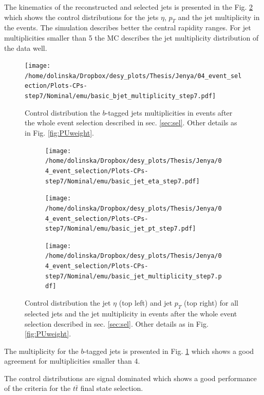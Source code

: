 The kinematics of the reconstructed and selected jets is presented in the Fig. \ref{fig:CPjetskin} which shows the control distributions for the
jets $\eta$, $p_{T}$ and the jet multiplicity in the events. The simulation describes better the central rapidity ranges. For jet multiplicities
smaller than 5 the MC describes the jet multiplicity distribution of the data well.
 
 \begin{figure}[h]
  \centering
  \texttt{[image: /home/dolinska/Dropbox/desy\_plots/Thesis/Jenya/04\_event\_selection/Plots-CPs-step7/Nominal/emu/basic\_bjet\_multiplicity\_step7.pdf]}
  \caption{Control distribution the $b$-tagged jets multiplicities in events after the whole event selection described in sec. \ref{sec:sel}. 
  Other details as in Fig. \ref{fig:PUweight}.}
  \label{fig:CPbJetMult}
 \end{figure}
 
 \begin{figure}[h]
 \centering
 \begin{subfigure}
   \centering
   \texttt{[image: /home/dolinska/Dropbox/desy\_plots/Thesis/Jenya/04\_event\_selection/Plots-CPs-step7/Nominal/emu/basic\_jet\_eta\_step7.pdf]}
 \end{subfigure}
 \begin{subfigure}
   \centering
   \texttt{[image: /home/dolinska/Dropbox/desy\_plots/Thesis/Jenya/04\_event\_selection/Plots-CPs-step7/Nominal/emu/basic\_jet\_pt\_step7.pdf]}
 \end{subfigure}
  \begin{subfigure}
   \centering
   \texttt{[image: /home/dolinska/Dropbox/desy\_plots/Thesis/Jenya/04\_event\_selection/Plots-CPs-step7/Nominal/emu/basic\_jet\_multiplicity\_step7.pdf]}
 \end{subfigure}
 \caption{Control distribution the jet $\eta$ (top left) and jet $p_{T}$ (top right) for all selected jets and the jet multiplicity in events 
  after the whole event selection described in sec. \ref{sec:sel}. 
  Other details as in Fig. \ref{fig:PUweight}.}
 \label{fig:CPjetskin}
 \end{figure}
 
The multiplicity for the $b$-tagged jets is presented in Fig. \ref{fig:CPbJetMult} which shows a good agreement for multiplicities smaller than 4.
 
The control distributions are signal dominated which shows a good performance of the criteria for the $t\bar{t}$ final state selection.



